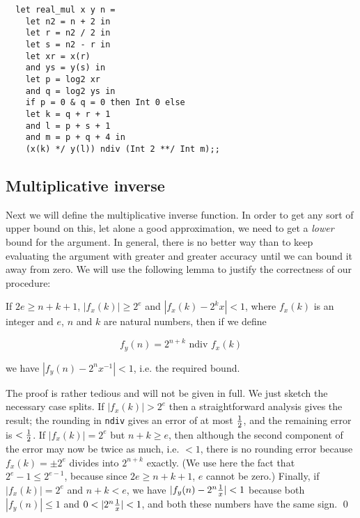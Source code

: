 \begin{boxed}\begin{verbatim}
  let real_mul x y n =
    let n2 = n + 2 in
    let r = n2 / 2 in
    let s = n2 - r in
    let xr = x(r)
    and ys = y(s) in
    let p = log2 xr
    and q = log2 ys in
    if p = 0 & q = 0 then Int 0 else
    let k = q + r + 1
    and l = p + s + 1
    and m = p + q + 4 in
    (x(k) */ y(l)) ndiv (Int 2 **/ Int m);;
\end{verbatim}\end{boxed}

\subsection{Multiplicative inverse}

Next we will define the multiplicative inverse function. In order to get any
sort of upper bound on this, let alone a good approximation, we need to get a
{\em lower} bound for the argument. In general, there is no better way than to
keep evaluating the argument with greater and greater accuracy until we can
bound it away from zero. We will use the following lemma to justify the
correctness of our procedure:

\begin{lemma}
If $2 e \geq n + k + 1$, $|f_x(k)| \geq 2^e$ and $|f_x(k) - 2^k x| < 1$, where
$f_x(k)$ is an integer and $e$, $n$ and $k$ are natural numbers, then if we
define

$$ f_y(n) = 2^{n+k} \mbox{ ndiv } f_x(k) $$

\noindent we have $|f_y(n) - 2^n x^{-1}| < 1$, i.e. the required bound.

\proof The proof is rather tedious and will not be given in full. We just
sketch the necessary case splits. If $|f_x(k)| > 2^e$ then a straightforward
analysis gives the result; the rounding in {\tt ndiv} gives an error of at most
$1 \over 2$, and the remaining error is $< {1 \over 2}$. If $|f_x(k)| = 2^e$ but
$n + k \geq e$, then although the second component of the error may now be
twice as much, i.e. $< 1$, there is no rounding error because $f_x(k) = \pm 2^e$
divides into $2^{n+k}$ exactly. (We use here the fact that $2^e - 1 \leq
2^{e-1}$, because since $2 e \geq n + k + 1$, $e$ cannot be zero.) Finally, if
$|f_x(k)| = 2^e$ and $n + k < e$, we have $|f_y(n) - 2^n {1 \over x}| < 1$ because
both $|f_y(n)| \leq 1$ and $0 < |2^n {1 \over x}| < 1$, and both these numbers
have the same sign. \qed

\end{lemma}

